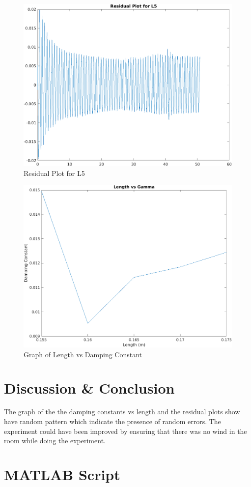 \begin{figure}[h!]
    \centering
    \includegraphics[width=\textwidth]{figures/L5_R.png}
    \caption{Residual Plot for L5}
    \label{fig:yx}
\end{figure}


\newpage
\begin{figure}[h!]
    \centering
    \includegraphics[width=\textwidth]{figures/L vs G.png}
    \caption{Graph of Length  vs Damping Constant}
    \label{fig:yx}
\end{figure}

\section{Discussion \& Conclusion}

The graph of the the damping constants vs length and the residual plots show have random pattern which indicate the presence of random errors. The experiment could have been improved by ensuring that there was no wind in the room while doing the experiment. 


\section{MATLAB Script}




